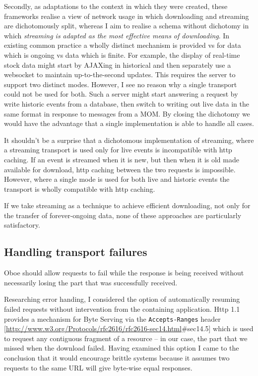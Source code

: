 \documentclass[]{article}
\begin{document}
Secondly, as adaptations to the context in which they were created,
these frameworks realise a view of network usage in which downloading
and streaming are dichotomously split, whereas I aim to realise a schema
without dichotomy in which \emph{streaming is adapted as the most
effective means of downloading}. In existing common practice a wholly
distinct mechanism is provided vs for data which is ongoing vs data
which is finite. For example, the display of real-time stock data might
start by AJAXing in historical and then separately use a websocket to
maintain up-to-the-second updates. This requires the server to support
two distinct modes. However, I see no reason why a single transport
could not be used for both. Such a server might start answering a
request by write historic events from a database, then switch to writing
out live data in the same format in response to messages from a MOM. By
closing the dichotomy we would have the advantage that a single
implementation is able to handle all cases.

It shouldn't be a surprise that a dichotomous implementation of
streaming, where a streaming transport is used only for live events is
incompatible with http caching. If an event is streamed when it is new,
but then when it is old made available for download, http caching
between the two requests is impossible. However, where a single mode is
used for both live and historic events the transport is wholly
compatible with http caching.

If we take streaming as a technique to achieve efficient downloading,
not only for the transfer of forever-ongoing data, none of these
approaches are particularly satisfactory.

\subsection{Handling transport failures}

Oboe should allow requests to fail while the response is being received
without necessarily losing the part that was successfully received.

Researching error handing, I considered the option of automatically
resuming failed requests without intervention from the containing
application. Http 1.1 provides a mechanism for Byte Serving via the
\texttt{Accepts-Ranges} header
{[}\url{http://www.w3.org/Protocols/rfc2616/rfc2616-sec14.html}\#sec14.5{]}
which is used to request any contiguous fragment of a resource -- in our
case, the part that we missed when the download failed. Having examined
this option I came to the conclusion that it would encourage brittle
systems because it assumes two requests to the same URL will give
byte-wise equal responses.
\end{document}
